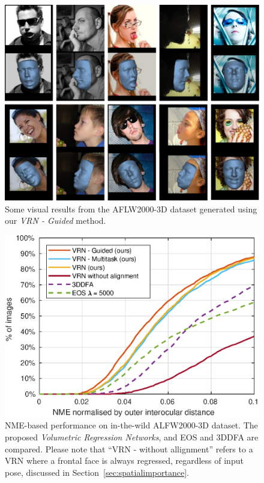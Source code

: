 \begin{figure}
  \centering
  \includegraphics[width=0.7\linewidth]{img/aflw2000res.pdf}
  \caption[Visual results on AFLW2000-3D dataset]{Some visual results
    from the AFLW2000-3D dataset generated using our \textit{VRN -
      Guided} method.}
  \label{fig:aflw2000res}
  \vspace{-4mm}
\end{figure}

\begin{figure}
  \centering
  \includegraphics[width=0.75\linewidth]{curves/aflw.eps}
  \caption[NME performance on AFLW2000-3D images]{NME-based
    performance on in-the-wild ALFW2000-3D dataset. The proposed
    \textit{Volumetric Regression Networks}, and EOS and 3DDFA are
    compared. Please note that ``VRN - without allignment'' refers to
    a VRN where a frontal face is always regressed, regardless of
    input pose, discussed in Section~\ref{sec:spatialimportance}.}
  \label{roc:aflw2000}
\end{figure}

